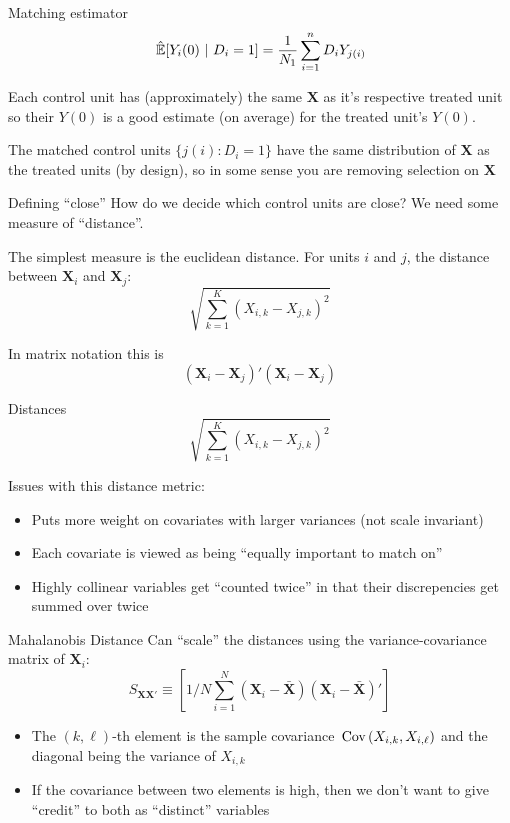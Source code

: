 \documentclass[aspectratio=169,t,11pt,table]{beamer}
\begin{document}
\begin{frame}{Matching estimator}
  $$
    \expechat{Y_i(0)}{D_i = 1} = \frac{1}{N_1} \sum_{i = 1}^n D_i Y_{j(i)}
  $$

  \bigskip
  Each control unit has (approximately) the same $\bm{X}$ as it's respective treated unit so their $Y(0)$ is a good estimate (on average) for the treated unit's $Y(0)$.
    
  \pause
  \bigskip
  The matched control units $\{ j(i): D_i = 1 \}$ have the same distribution of $\bm{X}$ as the treated units (by design), so in some sense you are removing selection on $\bm{X}$
\end{frame}

\begin{frame}{Defining ``close''}
  How do we decide which control units are close? We need some measure of ``distance''. 

  \bigskip
  The simplest measure is the \alert{euclidean distance}. For units $i$ and $j$, the distance between $\bm{X}_i$ and $\bm{X}_j$:
  $$
    \sqrt{\sum_{k = 1}^K (X_{i,k} - X_{j, k})^2}
  $$

  \pause 
  \bigskip
  In matrix notation this is 
  $$
    (\bm{X}_i - \bm{X}_j)' (\bm{X}_i - \bm{X}_j)
  $$
\end{frame}

\begin{frame}{Distances}
  $$
    \sqrt{\sum_{k = 1}^K (X_{i,k} - X_{j, k})^2}
  $$

  \bigskip
  Issues with this distance metric:
  \begin{itemize}
    \item Puts more weight on covariates with larger variances (not scale invariant)
    
    \item Each covariate is viewed as being ``equally important to match on''
    
    \item Highly collinear variables get ``counted twice'' in that their discrepencies get summed over twice 
  \end{itemize}

\end{frame}

\begin{frame}{Mahalanobis Distance}
  Can ``scale'' the distances using the variance-covariance matrix of $\bm{X}_i$:
  $$
    S_{\bm{X}\bm{X}'} \equiv \left[ 1/N \sum_{i=1}^N (\bm{X}_i - \bar{\bm{X}}) (\bm{X}_i - \bar{\bm{X}})' \right]
  $$
  \begin{itemize}
    \item The $(k, \ell)$-th element is the sample covariance $\cov{X_{i, k}, X_{i, \ell}}$ and the diagonal being the variance of $X_{i, k}$
    
    \item If the covariance between two elements is high, then we don't want to give ``credit'' to both as ``distinct'' variables
  \end{itemize}
\end{frame}
\end{document}
